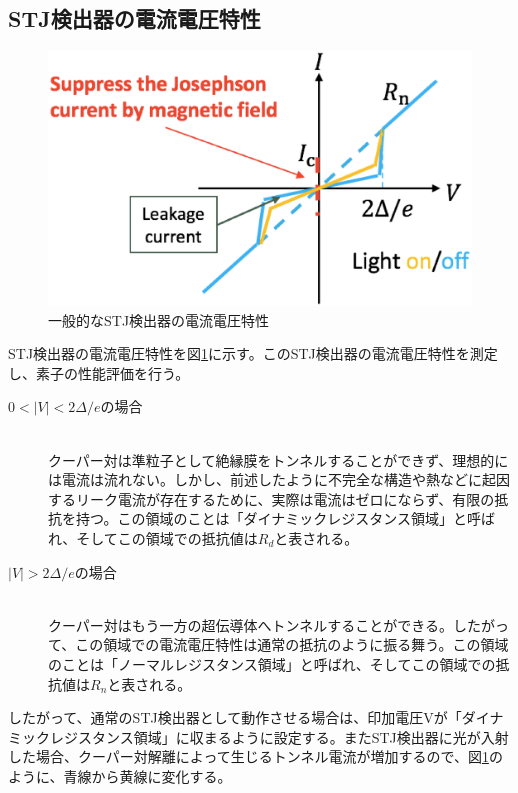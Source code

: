	\subsection{STJ検出器の電流電圧特性}
		\begin{figure}[htbp]
  			\begin{center}
    				\includegraphics[width=12.0cm]{./Chapter/Chapter2/Picture/STJ_IV.eps}
    				\caption{一般的なSTJ検出器の電流電圧特性}
	  			\label{fig:STJ_IV}
  			\end{center}
		\end{figure}
		STJ検出器の電流電圧特性を図\ref{fig:STJ_IV}に示す。このSTJ検出器の電流電圧特性を測定し、素子の性能評価を行う。
		\begin{description}
			\item[$0 < |V| < 2 \Delta / e$の場合]\mbox{}\\
				クーパー対は準粒子として絶縁膜をトンネルすることができず、理想的には電流は流れない。しかし、前述したように不完全な構造や熱などに起因するリーク電流が存在するために、実際は電流はゼロにならず、有限の抵抗を持つ。この領域のことは「ダイナミックレジスタンス領域」と呼ばれ、そしてこの領域での抵抗値は$R_d$と表される。
			\item[$|V| > 2 \Delta /e$の場合]\mbox{}\\
				クーパー対はもう一方の超伝導体へトンネルすることができる。したがって、この領域での電流電圧特性は通常の抵抗のように振る舞う。この領域のことは「ノーマルレジスタンス領域」と呼ばれ、そしてこの領域での抵抗値は$R_n$と表される。
		\end{description}
		
		したがって、通常のSTJ検出器として動作させる場合は、印加電圧Vが「ダイナミックレジスタンス領域」に収まるように設定する。またSTJ検出器に光が入射した場合、クーパー対解離によって生じるトンネル電流が増加するので、図\ref{fig:STJ_IV}のように、青線から黄線に変化する。
	
